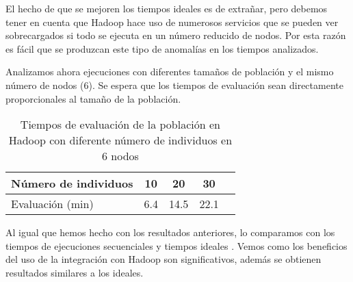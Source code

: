 El hecho de que se mejoren los tiempos ideales es de extra\~nar, pero debemos tener en cuenta que Hadoop hace uso de numerosos servicios que se pueden ver sobrecargados si todo se ejecuta en un n\'umero reducido de nodos. Por esta raz\'on es f\'acil que se produzcan este tipo de anomal\'ias en los tiempos analizados.

Analizamos ahora ejecuciones con diferentes tama\~nos de poblaci\'on y el mismo n\'umero de nodos (6). Se espera que los tiempos de evaluaci\'on sean directamente proporcionales al tama\~no de la poblaci\'on.

\begin{table}[H]
  \begin{center}
    \begin{center}
    \begin{tabular}{l | c c c c}
    N\'umero de individuos & 10 & 20 & 30 \\ \hline
    Evaluaci\'on (min) & 6.4 & 14.5 & 22.1 \\
    \end{tabular}
    \end{center}
    \caption{Tiempos de evaluaci\'on de la poblaci\'on en Hadoop con diferente n\'umero de individuos en 6 nodos}
    \label{tabla-dif-num-indiv}
  \end{center}
\end{table}


Al igual que hemos hecho con los resultados anteriores, lo comparamos con los tiempos de ejecuciones secuenciales y tiempos ideales . Vemos como los beneficios del uso de la integraci\'on con Hadoop son significativos, adem\'as se obtienen resultados similares a los ideales.









